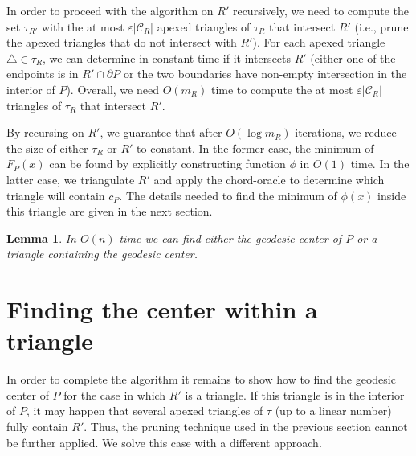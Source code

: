 \documentclass[a4paper]{article}
\newtheorem{lemma}[theorem]{Lemma}
\newcommand{\F}[2]{\ensuremath{F_{\scriptscriptstyle #1}(#2)}}
\newcommand{\cp}{\ensuremath{c_P}}
\newcommand{\m}{\ensuremath{m_{\scriptscriptstyle R}}}
\newcommand{\reg}{\ensuremath{R'}}
\newcommand{\tcell}{4-cell\xspace}
\newcommand{\C}{\ensuremath{{\mathcal C_R}}}
\begin{document}

In order to proceed with the algorithm on  $\reg$ recursively, we need to compute the set $\tau_{\reg}$ with the at most $\varepsilon |\C|$ apexed triangles of $\tau_R$ that intersect $\reg$ (i.e., prune the apexed triangles that do not intersect with $\reg$). For each apexed triangle $\triangle\in \tau_R$, we can determine in constant time if it intersects $\reg$ (either one of the endpoints is in $\reg\cap \partial P$ or the two boundaries have non-empty intersection in the interior of $P$). 
Overall, we need $O(\m)$ time to compute the at most $\varepsilon |\C|$ triangles of $\tau_R$ that intersect $\reg$.

By recursing on $\reg$, we guarantee that after $O(\log \m)$ iterations, we reduce the size of either $\tau_R$ or $\reg$ to constant. 
In the former case, the minimum of $\F{P}{x}$ can be found by explicitly constructing function $\phi$ in $O(1)$ time. 
In the latter case, we triangulate $\reg$ and apply the chord-oracle to determine which triangle will contain $\cp$. 
The details needed to find the minimum of $\phi(x)$ inside this triangle are given in the next section.


\begin{lemma}\label{lemma:Finding the convex trapezoid}
In $O(n)$ time we can find either the geodesic center of $P$ or a triangle containing the geodesic center.
\end{lemma}

\section{Finding the center within a triangle}\label{Section:Solving convex optimization poblem}
In order to complete the algorithm it remains to show how to find the geodesic center of $P$ for the case in which $\reg$ is a triangle. If this triangle is in the interior of $P$, it may happen that several apexed triangles of $\tau$ (up to a linear number) fully contain $\reg$. 
Thus, the pruning technique used in the previous section cannot be further applied. We solve this case with a different approach.
  
\end{document}
